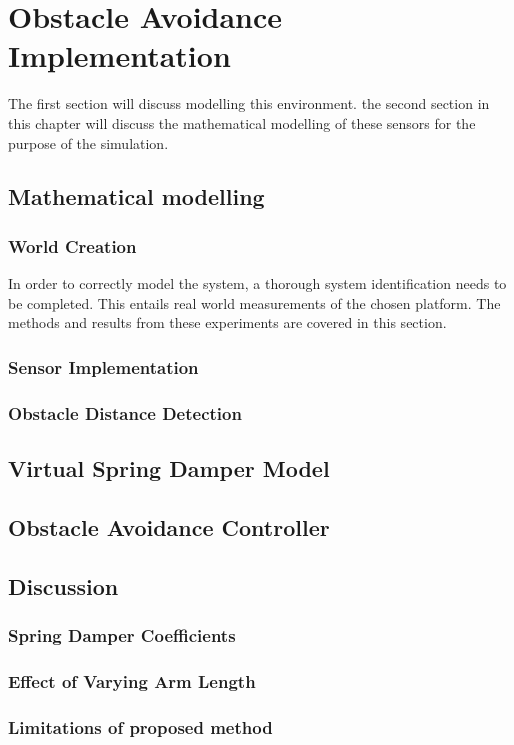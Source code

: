 \chapter{Obstacle Avoidance Implementation}
	
	The first section will discuss modelling this environment. the second section in this chapter will discuss the mathematical modelling of these sensors for the purpose of the simulation. 
	
	\section{Mathematical modelling}
		
		\subsection{World Creation}
		In order to correctly model the system, a thorough system identification needs to be completed. This entails real world measurements of the chosen platform. The methods and results from these experiments are covered in this section.
		
		\subsection{Sensor Implementation}	
		
		\subsection{Obstacle Distance Detection}
		
	\section{Virtual Spring Damper Model}
	
	\section{Obstacle Avoidance Controller}
		
	\section{Discussion}
	
		\subsection{Spring Damper Coefficients}
		
		\subsection{Effect of Varying Arm Length}
		
		\subsection{Limitations of proposed method}